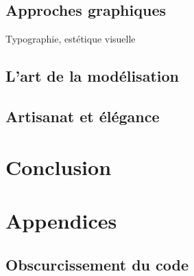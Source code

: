 \documentclass[12pt]{article} %
\begin{document}
\subsection{Approches graphiques}
Typographie, estétique visuelle

\subsection{L'art de la modélisation}
\subsection{Artisanat et élégance}




\section{Conclusion}

\newpage
\section{Appendices}

\subsection{Obscurcissement du code}



\printglossary[type=\acronymtype]

\printglossary


\newpage



\restoregeometry
\end{document}
